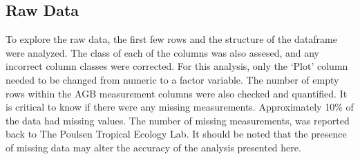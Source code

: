 \documentclass[12pt,]{article}
\newenvironment{Shaded}{\begin{snugshade}}{\end{snugshade}}
\newcommand{\CommentTok}[1]{\textcolor[rgb]{0.56,0.35,0.01}{\textit{#1}}}
\newcommand{\DecValTok}[1]{\textcolor[rgb]{0.00,0.00,0.81}{#1}}
\newcommand{\KeywordTok}[1]{\textcolor[rgb]{0.13,0.29,0.53}{\textbf{#1}}}
\newcommand{\NormalTok}[1]{#1}
\newcommand{\OperatorTok}[1]{\textcolor[rgb]{0.81,0.36,0.00}{\textbf{#1}}}
\newcommand{\StringTok}[1]{\textcolor[rgb]{0.31,0.60,0.02}{#1}}
\begin{document}
\hypertarget{raw-data}{%
\subsection{Raw Data}\label{raw-data}}

To explore the raw data, the first few rows and the structure of the
dataframe were analyzed. The class of each of the columns was also
assesed, and any incorrect column classes were corrected. For this
analysis, only the `Plot' column needed to be changed from numeric to a
factor variable. The number of empty rows within the AGB measurement
columns were also checked and quantified. It is critical to know if
there were any missing measurements. Approximately 10\% of the data had
missing values. The number of missing measurements, was reported back to
The Poulsen Tropical Ecology Lab. It should be noted that the presence
of missing data may alter the accuracy of the analysis presented here.

\begin{Shaded}
\end{Shaded}
\end{document}

